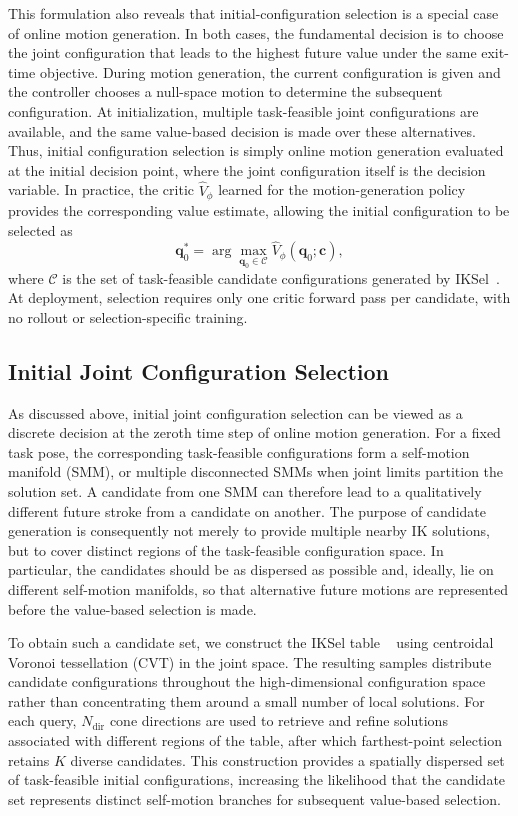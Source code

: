 \documentclass[journal, twoside]{IEEEtran}
\begin{document}
This formulation also reveals that initial-configuration selection is a
special case of online motion generation. In both cases, the fundamental
decision is to choose the joint configuration that leads to the highest
future value under the same exit-time objective. During motion generation,
the current configuration is given and the controller chooses a null-space
motion to determine the subsequent configuration. At initialization,
multiple task-feasible joint configurations are available, and the same
value-based decision is made over these alternatives. Thus, initial
configuration selection is simply online motion generation evaluated at
the initial decision point, where the joint configuration itself is the
decision variable. In practice, the critic
$\widehat{V}_{\phi}$ learned for the motion-generation policy provides the
corresponding value estimate, allowing the initial configuration to be
selected as
\begin{equation}
\label{eq:initial-selection}
\mathbf{q}_0^{*}
=
\arg\max_{\mathbf{q}_0\in\mathcal{C}}
\widehat{V}_{\phi}(\mathbf{q}_0;\mathbf{c}),
\end{equation}
where $\mathcal{C}$ is the set of task-feasible candidate configurations
generated by IKSel~\cite{yuan2026iksel}. At deployment, selection requires
only one critic forward pass per candidate, with no rollout or
selection-specific training.

\subsection{Initial Joint Configuration Selection}
\label{sec:select}

As discussed above, initial joint configuration selection can be viewed as
a discrete decision at the zeroth time step of online motion generation.
For a fixed task pose, the corresponding task-feasible configurations form
a self-motion manifold (SMM), or multiple disconnected SMMs when joint
limits partition the solution set. A candidate from one SMM can therefore
lead to a qualitatively different future stroke from a candidate on
another. The purpose of candidate generation is consequently not merely
to provide multiple nearby IK solutions, but to cover distinct regions of
the task-feasible configuration space. In particular, the candidates
should be as dispersed as possible and, ideally, lie on different
self-motion manifolds, so that alternative future motions are represented
before the value-based selection is made.

To obtain such a candidate set, we construct the IKSel table
~\cite{yuan2026iksel} using centroidal Voronoi tessellation (CVT) in the
joint space. The resulting samples distribute candidate configurations
throughout the high-dimensional configuration space rather than
concentrating them around a small number of local solutions. For each
query,
$N_{\mathrm{dir}}$ cone directions are used to retrieve and refine
solutions associated with different regions of the table, after which
farthest-point selection retains $K$ diverse candidates. This construction
provides a spatially dispersed set of task-feasible initial configurations,
increasing the likelihood that the candidate set represents distinct
self-motion branches for subsequent value-based selection.
\end{document}
